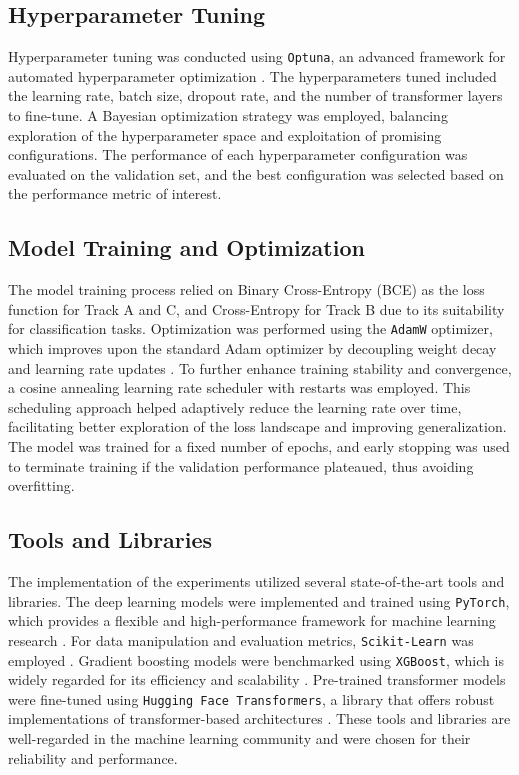 \subsection{Hyperparameter Tuning}

Hyperparameter tuning was conducted using \texttt{Optuna}, an advanced framework for automated hyperparameter optimization \citep{Akiba2019Optuna}. The hyperparameters tuned included the learning rate, batch size, dropout rate, and the number of transformer layers to fine-tune. A Bayesian optimization strategy was employed, balancing exploration of the hyperparameter space and exploitation of promising configurations. The performance of each hyperparameter configuration was evaluated on the validation set, and the best configuration was selected based on the performance metric of interest.

\subsection{Model Training and Optimization}

The model training process relied on Binary Cross-Entropy (BCE) as the loss function for Track A and C, and Cross-Entropy for Track B due to its suitability for classification tasks. Optimization was performed using the \texttt{AdamW} optimizer, which improves upon the standard Adam optimizer by decoupling weight decay and learning rate updates \citep{Loshchilov2019AdamW}. To further enhance training stability and convergence, a cosine annealing learning rate scheduler with restarts was employed. This scheduling approach helped adaptively reduce the learning rate over time, facilitating better exploration of the loss landscape and improving generalization. The model was trained for a fixed number of epochs, and early stopping was used to terminate training if the validation performance plateaued, thus avoiding overfitting.

\subsection{Tools and Libraries}

The implementation of the experiments utilized several state-of-the-art tools and libraries. The deep learning models were implemented and trained using \texttt{PyTorch}, which provides a flexible and high-performance framework for machine learning research \citep{Paszke2019PyTorch}. For data manipulation and evaluation metrics, \texttt{Scikit-Learn} was employed \citep{Pedregosa2011ScikitLearn}. Gradient boosting models were benchmarked using \texttt{XGBoost}, which is widely regarded for its efficiency and scalability \citep{Chen2016XGBoost}. Pre-trained transformer models were fine-tuned using \texttt{Hugging Face Transformers}, a library that offers robust implementations of transformer-based architectures \citep{Wolf2019HuggingFace}. These tools and libraries are well-regarded in the machine learning community and were chosen for their reliability and performance.

